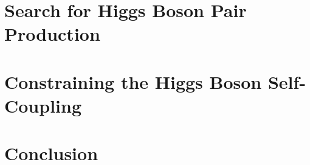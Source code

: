 \documentclass[PhD, UKenglish]{scrbook}
\begin{document}
\chapter{Search for Higgs Boson Pair Production}%
\label{sec:dihiggs}











\chapter{Constraining the Higgs Boson Self-Coupling}%
\label{sec:higgs_self_coupling}




\chapter{Conclusion}%
\label{sec:conclusion}



%   
%   
\end{document}
